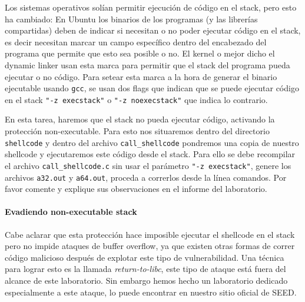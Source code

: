 
Los sistemas operativos solían permitir ejecución de código en el stack, pero esto ha cambiado: En Ubuntu los binarios de los programas (y las librerías compartidas) deben de indicar si necesitan o no poder ejecutar código en el stack, es decir necesitan marcar un campo específico dentro del encabezado del programa que permite que esto sea posible o no. El kernel o mejor dicho el dynamic linker usan esta marca para permitir que el stack del programa pueda ejecutar o no código. Para setear esta marca a la hora de generar el binario ejecutable usando \texttt{gcc}, se usan dos flags que indican que se puede ejecutar código en el stack \texttt{"-z execstack"} o \texttt{"-z noexecstack"} que indica lo contrario.

En esta tarea, haremos que el stack no pueda ejecutar código, activando la protección non-executable. Para esto nos situaremos dentro del directorio \texttt{shellcode} y dentro del archivo \texttt{call\_shellcode} pondremos una copia de nuestro shellcode y ejecutaremos este código desde el stack.
Para ello se debe recompilar el archivo \texttt{call\_shellcode.c} sin usar el parámetro \texttt{"-z execstack"}, genere los archivos \texttt{a32.out} y \texttt{a64.out}, proceda a correrlos desde la línea comandos.
Por favor comente y explique sus observaciones en el informe del laboratorio.


\paragraph{Evadiendo non-executable stack}
Cabe aclarar que esta protección hace imposible ejecutar el shellcode en el stack pero no impide ataques de buffer overflow, ya que existen otras formas de correr código malicioso después de explotar este tipo de vulnerabilidad. Una técnica para lograr esto es la llamada {\em return-to-libc}, este tipo de ataque está fuera del alcance de este laboratorio. Sin embargo hemos hecho un laboratorio dedicado especialmente a este ataque, lo puede encontrar en nuestro sitio oficial de SEED.


